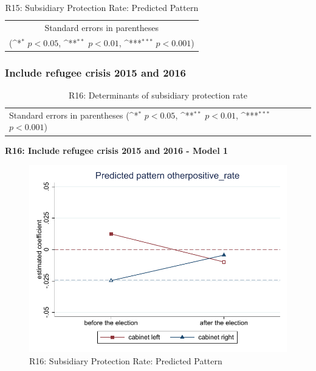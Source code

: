 \documentclass[10pt,a4paper]{scrartcl}
\begin{document}
\begin{table}[!ht]\centering
	\footnotesize
	\renewcommand{\arraystretch}{1.2}
	\def\sym#1{\ifmmode^{#1}\else\(^{#1}\)\fi}
	\caption{R15: Subsidiary Protection Rate: Predicted Pattern}
	\begin{tabular}{l*{2}{c}}
		\hline\hline
		
		\hline\hline
		\multicolumn{3}{c}{\footnotesize Standard errors in parentheses} \\
		\multicolumn{3}{c}{\footnotesize (\sym{*} \(p<0.05\), \sym{**} \(p<0.01\), \sym{***} \(p<0.001\))} \\
	\end{tabular}
\end{table}






\clearpage
\FloatBarrier
\subsubsection{Include refugee crisis 2015 and 2016}
\begin{table}[!ht]\centering
	\renewcommand{\arraystretch}{1.25}
	\small
	\def\sym#1{\ifmmode^{#1}\else\(^{#1}\)\fi}
	\caption{R16: Determinants of subsidiary protection rate}
	\begin{tabular}{l*{3}{c}}
		\hline\hline
		
		\hline\hline
		\multicolumn{4}{l}{\footnotesize Standard errors in parentheses (\sym{*} \(p<0.05\), \sym{**} \(p<0.01\), \sym{***} \(p<0.001\))}\\
	\end{tabular}
\end{table}

\clearpage
\textbf{R16: Include refugee crisis 2015 and 2016 - Model 1}
\begin{figure}[!ht]
	\centering
	\includegraphics[width=1\textwidth]{figures_edited/otherpositive_rate_graph1_R16.pdf}
	\caption{R16: Subsidiary Protection Rate: Predicted Pattern}
\end{figure}
\end{document}
